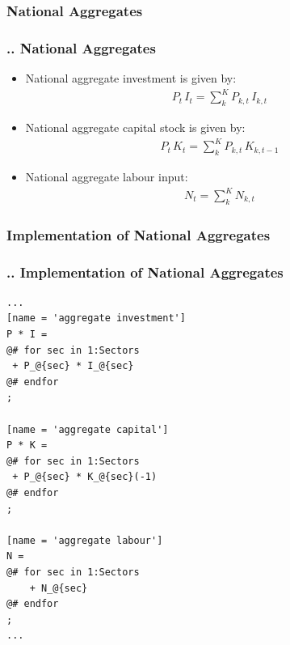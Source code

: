 \documentclass[11pt,aspectratio=169]{beamer}
\begin{document}
\subsubsection{National Aggregates}
\begin{frame}
\frametitle{{\thesection.\thesubsection.\thesubsubsection} National Aggregates}
\scriptsize
\begin{itemize}
\item National aggregate investment is given by:
\begin{align*}
P_{t} \, I_{t} = \sum_{k}^{K} P_{k,t} \, I_{k,t}
\end{align*}
\item National aggregate capital stock is given by:
\begin{align*}
P_{t} \, K_{t} = \sum_{k}^{K} P_{k,t} \, K_{k,t-1}
\end{align*}
\item National aggregate labour input:
\begin{align*}
N_{t} = \sum_{k}^{K} N_{k,t}
\end{align*}

\end{itemize}
\end{frame}

\subsubsection{Implementation of National Aggregates}
\begin{frame}[fragile]
\frametitle{{\thesection.\thesubsection.\thesubsubsection} Implementation of National Aggregates}

\begin{lstlisting}[frame = single]
...
[name = 'aggregate investment']
P * I = 
@# for sec in 1:Sectors
 + P_@{sec} * I_@{sec}
@# endfor
;

[name = 'aggregate capital']
P * K = 
@# for sec in 1:Sectors
 + P_@{sec} * K_@{sec}(-1)
@# endfor
;

[name = 'aggregate labour']
N = 
@# for sec in 1:Sectors
    + N_@{sec}
@# endfor
;
...
\end{lstlisting}
\end{frame}
\end{document}
